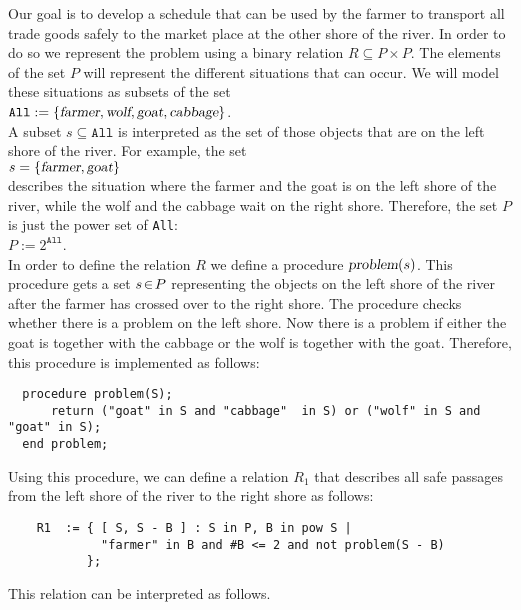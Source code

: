 \noindent
Our goal is to develop a schedule that can be used by the farmer to transport all trade goods 
safely to the market place at the other shore of the river.
In order to do so we represent the problem using a binary relation
$R \subseteq P \times P$.
The elements of the set $P$ will represent the different situations that can occur.
We will model these situations as subsets of the set 
\\[0.2cm]
\hspace*{1.3cm} 
$\texttt{All} := \{ \textsl{farmer}, \textsl{wolf}, \textsl{goat},\textsl{cabbage} \}$.
\\[0.2cm]
A subset $s \subseteq \mathtt{All}$ is interpreted as the set of those objects 
that are on the left shore of the river. For example, the set 
\\[0.2cm]
\hspace*{1.3cm}
$s = \{ \textsl{farmer}, \textsl{goat} \}$
\\[0.2cm]
describes the situation where the farmer and the goat is on the left shore of the river, while the
wolf and the cabbage wait on the right shore.  Therefore, the set $P$ is just the power set of \texttt{All}:
\\[0.2cm]
\hspace*{1.3cm}
$P := 2^\mathtt{All}$.
\\[0.2cm]
In order to define the relation  $R$ we define a procedure 
$\textsl{problem}(s)$. This procedure gets a set $s \!\in\! P$ representing the objects on the left shore
of the river after the farmer has crossed over to the right shore.  The procedure checks
whether there is a problem on the left shore.
Now there is a problem if either the goat is together with the cabbage or the wolf is
together with the goat.  Therefore, this procedure is implemented as follows:
\begin{verbatim}
  procedure problem(S);
      return ("goat" in S and "cabbage"  in S) or ("wolf" in S and "goat" in S);
  end problem;
\end{verbatim}
Using this procedure, we can define a relation $R_1$ that describes all safe passages from the left
shore of the river to the right shore as follows:
\begin{verbatim}
    R1  := { [ S, S - B ] : S in P, B in pow S |
             "farmer" in B and #B <= 2 and not problem(S - B) 
           };
\end{verbatim}
This relation can be interpreted as follows.
